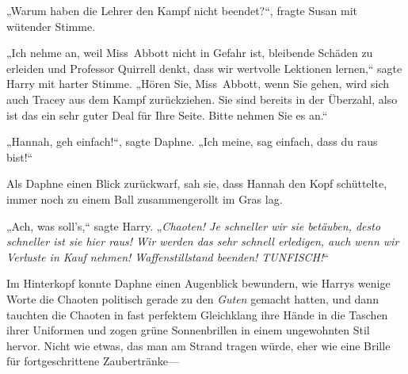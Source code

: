 „Warum haben die Lehrer den Kampf nicht beendet?“, fragte Susan mit wütender Stimme.

„Ich nehme an, weil Miss~Abbott nicht in Gefahr ist, bleibende Schäden zu erleiden und Professor Quirrell denkt, dass wir wertvolle Lektionen lernen,“ sagte Harry mit harter Stimme. „Hören Sie, Miss~Abbott, wenn Sie gehen, wird sich auch Tracey aus dem Kampf zurückziehen. Sie sind bereits in der Überzahl, also ist das ein sehr guter Deal für Ihre Seite. Bitte nehmen Sie es an.“

„Hannah, geh einfach!“, sagte Daphne. „Ich meine, sag einfach, dass du raus bist!“

Als Daphne einen Blick zurückwarf, sah sie, dass Hannah den Kopf schüttelte, immer noch zu einem Ball zusammengerollt im Gras lag.

„Ach, was soll's,“ sagte Harry. „\emph{Chaoten! Je schneller wir sie betäuben, desto schneller ist sie hier raus! Wir werden das sehr schnell erledigen, auch wenn wir Verluste in Kauf nehmen! Waffenstillstand beenden! TUNFISCH!}“

Im Hinterkopf konnte Daphne einen Augenblick bewundern, wie Harrys wenige Worte die Chaoten politisch gerade zu den \emph{Guten} gemacht hatten, und dann tauchten die Chaoten in fast perfektem Gleichklang ihre Hände in die Taschen ihrer Uniformen und zogen grüne Sonnenbrillen in einem ungewohnten Stil hervor. Nicht wie etwas, das man am Strand tragen würde, eher wie eine Brille für fortgeschrittene Zaubertränke—

